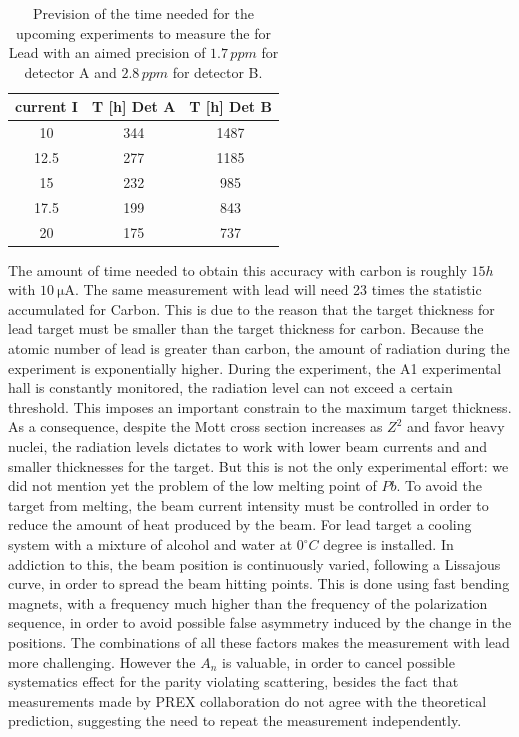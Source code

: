 \begin{table}[h]
\centering
\begin{tabular}{c|c|c}
\hline
   current I &   T [h] Det A &   T [h] Det B \\
\hline
        10   &       344 &      1487  \\
        12.5 &       277 &      1185   \\
        15   &       232 &      985 \\
        17.5 &       199 &      843 \\
        20   &       175 &      737 \\
\hline
\end{tabular}
\caption{Prevision of the time needed for the upcoming experiments to measure the \transv for Lead with an aimed precision of $1.7 \, ppm$ for detector A and $2.8 \, ppm$ for detector B.}
\end{table}

The amount of time needed to obtain this accuracy with carbon is roughly $15 h$ with $\SI{10}{\micro \ampere}$. The same measurement with lead will need 23 times the statistic accumulated for Carbon. This is due to the reason that the target thickness for lead target must be smaller than the target thickness for carbon. Because the atomic number of lead is greater than carbon, the amount of radiation during the experiment is exponentially higher. During the experiment, the A1 experimental hall is constantly monitored, the radiation level can not exceed a certain threshold. This imposes an important constrain to the maximum target thickness. As a consequence, despite the Mott cross section increases as $Z^{2}$ and favor heavy nuclei, the radiation levels dictates to work with lower beam currents and and smaller thicknesses for the target. But this is not the only experimental effort: we did not mention yet the problem of the low melting point of $Pb$. To avoid the target from melting, the beam current intensity must be controlled in order to reduce the amount of heat produced by the beam. For lead target a cooling system with a mixture of alcohol and water at $0^{\circ} C$  degree is installed. In addiction to this, the beam position is continuously varied, following a Lissajous curve, in order to spread the beam hitting points. This is done using fast bending magnets, with a frequency much higher than the frequency of the polarization sequence, in order to avoid possible false asymmetry induced by the change in the positions. The combinations of all these factors makes the measurement with lead more challenging. However the $A_{n}$ is valuable, in order to cancel possible systematics effect for the parity violating scattering, besides the fact that measurements made by PREX collaboration \cite{HAPPEX:2012fud} do not agree with the theoretical prediction, suggesting the need to repeat the measurement independently. 
 
